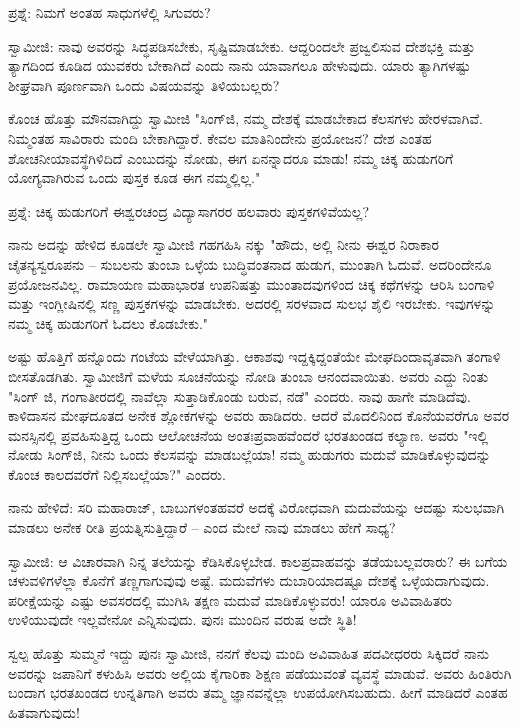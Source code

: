 ಪ್ರಶ್ನೆ: ನಿಮಗೆ ಅಂತಹ ಸಾಧುಗಳೆಲ್ಲಿ ಸಿಗುವರು?

ಸ್ವಾಮೀಜಿ: ನಾವು ಅವರನ್ನು ಸಿದ್ಧಪಡಿಸಬೇಕು, ಸೃಷ್ಟಿಮಾಡಬೇಕು. ಆದ್ದರಿಂದಲೇ ಪ್ರಜ್ವಲಿಸುವ ದೇಶಭಕ್ತಿ ಮತ್ತು ತ್ಯಾಗದಿಂದ ಕೂಡಿದ ಯುವಕರು ಬೇಕಾಗಿದೆ ಎಂದು ನಾನು ಯಾವಾಗಲೂ ಹೇಳುವುದು. ಯಾರು ತ್ಯಾಗಿಗಳಷ್ಟು ಶೀಘ್ರವಾಗಿ ಪೂರ್ಣವಾಗಿ ಒಂದು ವಿಷಯವನ್ನು ತಿಳಿಯಬಲ್ಲರು?

ಕೊಂಚ ಹೊತ್ತು ಮೌನವಾಗಿದ್ದು ಸ್ವಾಮೀಜಿ "ಸಿಂಗ್‌ಜಿ, ನಮ್ಮ ದೇಶಕ್ಕೆ ಮಾಡಬೇಕಾದ ಕೆಲಸಗಳು ಹೇರಳವಾಗಿವೆ. ನಿಮ್ಮಂತಹ ಸಾವಿರಾರು ಮಂದಿ ಬೇಕಾಗಿದ್ದಾರೆ. ಕೇವಲ ಮಾತಿನಿಂದೇನು ಪ್ರಯೋಜನ? ದೇಶ ಎಂತಹ ಶೋಚನೀಯಾವಸ್ಥೆಗಿಳಿದಿದೆ ಎಂಬುದನ್ನು ನೋಡು, ಈಗ ಏನನ್ನಾದರೂ ಮಾಡು! ನಮ್ಮ ಚಿಕ್ಕ ಹುಡುಗರಿಗೆ ಯೋಗ್ಯವಾಗಿರುವ ಒಂದು ಪುಸ್ತಕ ಕೂಡ ಈಗ ನಮ್ಮಲ್ಲಿಲ್ಲ."

ಪ್ರಶ್ನೆ: ಚಿಕ್ಕ ಹುಡುಗರಿಗೆ ಈಶ್ವರಚಂದ್ರ ವಿದ್ಯಾಸಾಗರರ ಹಲವಾರು ಪುಸ್ತಕಗಳಿವೆಯಲ್ಲ?

ನಾನು ಅದನ್ನು ಹೇಳಿದ ಕೂಡಲೇ ಸ್ವಾಮೀಜಿ ಗಹಗಹಿಸಿ ನಕ್ಕು "ಹೌದು, ಅಲ್ಲಿ ನೀನು ಈಶ್ವರ ನಿರಾಕಾರ ಚೈತನ್ಯಸ್ವರೂಪನು – ಸುಬಲನು ತುಂಬಾ ಒಳ್ಳೆಯ ಬುದ್ಧಿವಂತನಾದ ಹುಡುಗ, ಮುಂತಾಗಿ ಓದುವೆ. ಅದರಿಂದೇನೂ ಪ್ರಯೋಜನವಿಲ್ಲ. ರಾಮಾಯಣ ಮಹಾಭಾರತ ಉಪನಿಷತ್ತು ಮುಂತಾದವುಗಳಿಂದ ಚಿಕ್ಕ ಕಥೆಗಳನ್ನು ಆರಿಸಿ ಬಂಗಾಳಿ ಮತ್ತು ಇಂಗ್ಲೀಷಿನಲ್ಲಿ ಸಣ್ಣ ಪುಸ್ತಕಗಳನ್ನು ಮಾಡಬೇಕು. ಅದರಲ್ಲಿ ಸರಳವಾದ ಸುಲಭ ಶೈಲಿ ಇರಬೇಕು. ಇವುಗಳನ್ನು ನಮ್ಮ ಚಿಕ್ಕ ಹುಡುಗರಿಗೆ ಓದಲು ಕೊಡಬೇಕು."

ಅಷ್ಟು ಹೊತ್ತಿಗೆ ಹನ್ನೊಂದು ಗಂಟೆಯ ವೇಳೆಯಾಗಿತ್ತು. ಆಕಾಶವು ಇದ್ದಕ್ಕಿದ್ದಂತೆಯೇ ಮೇಘದಿಂದಾವೃತವಾಗಿ ತಂಗಾಳಿ ಬೀಸತೊಡಗಿತು. ಸ್ವಾಮೀಜಿಗೆ ಮಳೆಯ ಸೂಚನೆಯನ್ನು ನೋಡಿ ತುಂಬಾ ಆನಂದವಾಯಿತು. ಅವರು ಎದ್ದು ನಿಂತು "ಸಿಂಗ್ ಜಿ, ಗಂಗಾತೀರದಲ್ಲಿ ನಾವೆಲ್ಲಾ ಸುತ್ತಾಡಿಕೊಂಡು ಬರುವ, ನಡೆ" ಎಂದರು. ನಾವು ಹಾಗೇ ಮಾಡಿದೆವು. ಕಾಳಿದಾಸನ ಮೇಘದೂತದ ಅನೇಕ ಶ್ಲೋಕಗಳನ್ನು ಅವರು ಹಾಡಿದರು. ಆದರೆ ಮೊದಲಿನಿಂದ ಕೊನೆಯವರೆಗೂ ಅವರ ಮನಸ್ಸಿನಲ್ಲಿ ಪ್ರವಹಿಸುತ್ತಿದ್ದ ಒಂದು ಆಲೋಚನೆಯ ಅಂತಃಪ್ರವಾಹವೆಂದರೆ ಭರತಖಂಡದ ಕಲ್ಯಾಣ. ಅವರು "ಇಲ್ಲಿ ನೋಡು ಸಿಂಗ್‌ಜಿ, ನೀನು ಒಂದು ಕೆಲಸವನ್ನು ಮಾಡಬಲ್ಲೆಯಾ! ನಮ್ಮ ಹುಡುಗರು ಮದುವೆ ಮಾಡಿಕೊಳ್ಳುವುದನ್ನು ಕೊಂಚ ಕಾಲದವರೆಗೆ ನಿಲ್ಲಿಸಬಲ್ಲೆಯಾ?" ಎಂದರು.

ನಾನು ಹೇಳಿದೆ: ಸರಿ ಮಹಾರಾಜ್, ಬಾಬುಗಳಂತಹವರೆ ಅದಕ್ಕೆ ವಿರೋಧವಾಗಿ ಮದುವೆಯನ್ನು ಆದಷ್ಟು ಸುಲಭವಾಗಿ ಮಾಡಲು ಅನೇಕ ರೀತಿ ಪ್ರಯತ್ನಿಸುತ್ತಿದ್ದಾರೆ – ಎಂದ ಮೇಲೆ ನಾವು ಮಾಡಲು ಹೇಗೆ ಸಾಧ್ಯ?

ಸ್ವಾಮೀಜಿ: ಆ ವಿಚಾರವಾಗಿ ನಿನ್ನ ತಲೆಯನ್ನು ಕೆಡಿಸಿಕೊಳ್ಳಬೇಡ. ಕಾಲಪ್ರವಾಹವನ್ನು ತಡೆಯಬಲ್ಲವರಾರು? ಈ ಬಗೆಯ ಚಳುವಳಿಗಳೆಲ್ಲಾ ಕೊನೆಗೆ ತಣ್ಣಗಾಗುವುವು ಅಷ್ಟೆ. ಮದುವೆಗಳು ದುಬಾರಿಯಾದಷ್ಟೂ ದೇಶಕ್ಕೆ ಒಳ್ಳೆಯದಾಗುವುದು. ಪರೀಕ್ಷೆಯನ್ನು ಎಷ್ಟು ಅವಸರದಲ್ಲಿ ಮುಗಿಸಿ ತಕ್ಷಣ ಮದುವೆ ಮಾಡಿಕೊಳ್ಳುವರು! ಯಾರೂ ಅವಿವಾಹಿತರು ಉಳಿಯುವುದೇ ಇಲ್ಲವೇನೋ ಎನ್ನಿಸುವುದು. ಪುನಃ ಮುಂದಿನ ವರುಷ ಅದೇ ಸ್ಥಿತಿ!

ಸ್ವಲ್ಪ ಹೊತ್ತು ಸುಮ್ಮನೆ ಇದ್ದು ಪುನಃ ಸ್ವಾಮೀಜಿ, ನನಗೆ ಕೆಲವು ಮಂದಿ ಅವಿವಾಹಿತ ಪದವೀಧರರು ಸಿಕ್ಕಿದರೆ ನಾನು ಅವರನ್ನು ಜಪಾನಿಗೆ ಕಳುಹಿಸಿ ಅವರು ಅಲ್ಲಿಯ ಕೈಗಾರಿಕಾ ಶಿಕ್ಷಣ ಪಡೆಯುವಂತೆ ವ್ಯವಸ್ಥೆ ಮಾಡುವೆ. ಅವರು ಹಿಂತಿರುಗಿ ಬಂದಾಗ ಭರತಖಂಡದ ಉನ್ನತಿಗಾಗಿ ಅವರು ತಮ್ಮ ಜ್ಞಾನವನ್ನೆಲ್ಲಾ ಉಪಯೋಗಿಸಬಹುದು. ಹೀಗೆ ಮಾಡಿದರೆ ಎಂತಹ ಹಿತವಾಗುವುದು!

